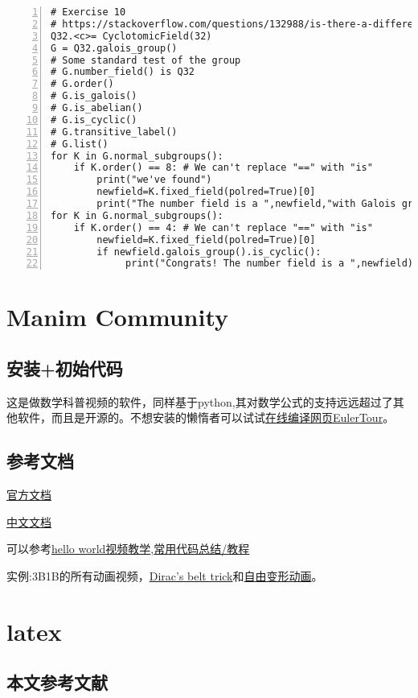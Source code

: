 \documentclass[11pt]{amsart}
\begin{document}
\begin{lstlisting}[numbers=left,numberstyle=\tiny,numbersep=10pt]
# Exercise 10
# https://stackoverflow.com/questions/132988/is-there-a-difference-between-and-is
Q32.<c>= CyclotomicField(32) 
G = Q32.galois_group()
# Some standard test of the group
# G.number_field() is Q32
# G.order()
# G.is_galois()
# G.is_abelian()
# G.is_cyclic()
# G.transitive_label()
# G.list()
for K in G.normal_subgroups():
    if K.order() == 8: # We can't replace "==" with "is"
        print("we've found")
        newfield=K.fixed_field(polred=True)[0]
        print("The number field is a ",newfield,"with Galois group of order",newfield.galois_group().order())
for K in G.normal_subgroups():
    if K.order() == 4: # We can't replace "==" with "is"
        newfield=K.fixed_field(polred=True)[0]
        if newfield.galois_group().is_cyclic():
             print("Congrats! The number field is a ",newfield)
\end{lstlisting}
\section{Manim Community}
\subsection{安装+初始代码}
这是做数学科普视频的软件，同样基于python,其对数学公式的支持远远超过了其他软件，而且是开源的。不想安装的懒惰者可以试试\href{https://eulertour.com/lab}{在线编译网页EulerTour}。
\subsection{参考文档}
\href{https://3b1b.github.io/manim/}{官方文档}

\href{https://docs.manim.org.cn/}{中文文档}

可以参考\href{https://www.bilibili.com/video/BV1KD4y1D7xD}{hello world视频教学},\href{https://www.bilibili.com/video/BV1p54y197cC}{常用代码总结/教程} 

实例:3B1B的所有动画视频，\href{https://www.youtube.com/watch?v=ACZC_XEyg9U&list=PLnQX-jgAF5pTkwtUuVpqS5tuWmJ-6ZM-Z&index=10}{Dirac's belt trick}和\href{https://www.bilibili.com/video/BV1sK4y1V7TE}{自由变形动画}。

\section{latex} 

\subsection{本文参考文献}
\end{document}
